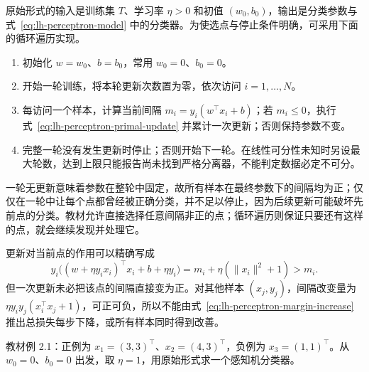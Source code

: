 原始形式的输入是训练集 $T$、学习率 $\eta>0$ 和初值 $(w_0,b_0)$，输出是分类参数与式~\eqref{eq:lh-perceptron-model} 中的分类器。为使选点与停止条件明确，可采用下面的循环遍历实现。
\begin{enumerate}
  \item 初始化 $w=w_0$、$b=b_0$，常用 $w_0=0$、$b_0=0$。
  \item 开始一轮训练，将本轮更新次数置为零，依次访问 $i=1,\ldots,N$。
  \item 每访问一个样本，计算当前间隔 $m_i=y_i(w^\top x_i+b)$；若 $m_i\leq0$，执行式~\eqref{eq:lh-perceptron-primal-update} 并累计一次更新；否则保持参数不变。
  \item 完整一轮没有发生更新时停止；否则开始下一轮。在线性可分性未知时另设最大轮数，达到上限只能报告尚未找到严格分离器，不能判定数据必定不可分。
\end{enumerate}

一轮无更新意味着参数在整轮中固定，故所有样本在最终参数下的间隔均为正；仅仅在一轮中让每个点都曾经被正确分类，并不足以停止，因为后续更新可能破坏先前点的分类。教材允许直接选择任意间隔非正的点；循环遍历则保证只要还有这样的点，就会继续发现并处理它。

更新对当前点的作用可以精确写成
\begin{equation}
\label{eq:lh-perceptron-margin-increase}
y_i\bigl((w+\eta y_i x_i)^\top x_i+b+\eta y_i\bigr)
=m_i+\eta(\|x_i\|^2+1)>m_i.
\end{equation}
但一次更新未必把该点的间隔直接变为正。对其他样本 $(x_j,y_j)$，间隔改变量为 $\eta y_i y_j(x_i^\top x_j+1)$，可正可负，所以不能由式~\eqref{eq:lh-perceptron-margin-increase} 推出总损失每步下降，或所有样本同时得到改善。

\begin{example}
\label{ex:lh-perceptron-primal}
教材例 2.1：正例为 $x_1=(3,3)^\top$、$x_2=(4,3)^\top$，负例为 $x_3=(1,1)^\top$。从 $w_0=0$、$b_0=0$ 出发，取 $\eta=1$，用原始形式求一个感知机分类器。
\end{example}


